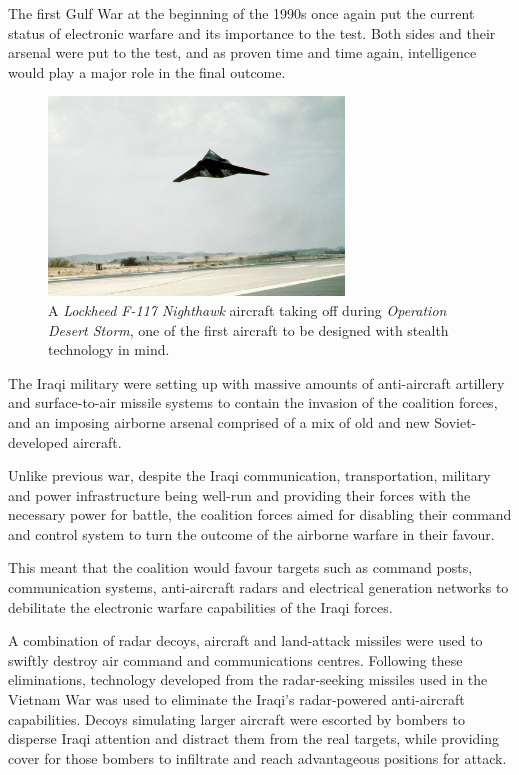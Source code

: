 \documentclass[english,purist]{ist-report}
\begin{document}
The first Gulf War at the beginning of the 1990s once again put the current status of electronic warfare and its importance to the test. Both sides and their arsenal were put to the test, and as proven time and time again, intelligence would play a major role in the final outcome.
\begin{figure}[ht]
    \centering
    \includegraphics[width = 0.7\textwidth]{f117}
    \caption{A \textit{Lockheed F-117 Nighthawk} aircraft taking off during \textit{Operation Desert Storm}, one of the first aircraft to be designed with stealth technology in mind.}
    \label{fig:gulfwar}
\end{figure}

The Iraqi military were setting up with massive amounts of anti-aircraft artillery and surface-to-air missile systems to contain the invasion of the coalition forces, and an imposing airborne arsenal comprised of a mix of old and new Soviet-developed aircraft.

Unlike previous war, despite the Iraqi communication, transportation, military and power infrastructure being well-run and providing their forces with the necessary power for battle, the coalition forces aimed for disabling their command and control system to turn the outcome of the airborne warfare in their favour.

This meant that the coalition would favour targets such as command posts, communication systems, anti-aircraft radars and electrical generation networks to debilitate the electronic warfare capabilities of the Iraqi forces.

A combination of radar decoys, \jamming{} aircraft and land-attack missiles were used to swiftly destroy air command and communications centres. Following these eliminations, technology developed from the radar-seeking missiles used in the Vietnam War was used to eliminate the Iraqi's radar-powered anti-aircraft capabilities. Decoys simulating larger aircraft were escorted by bombers to disperse Iraqi attention and distract them from the real targets, while providing cover for those bombers to infiltrate and reach advantageous positions for attack.
\end{document}
